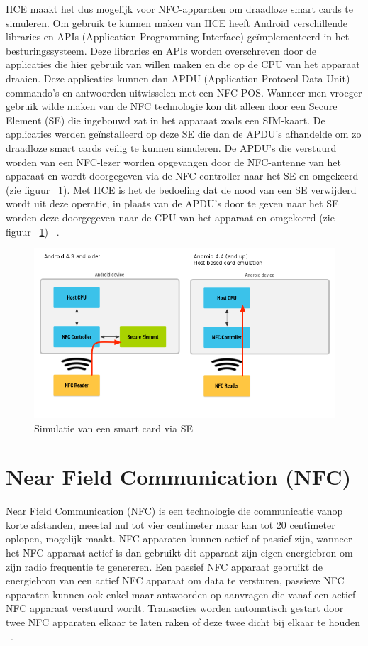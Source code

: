 HCE maakt het dus mogelijk voor NFC-apparaten om draadloze smart cards te simuleren. Om gebruik te kunnen maken van HCE heeft Android verschillende libraries en APIs (Application Programming Interface) geïmplementeerd in het besturingssysteem. Deze libraries en APIs worden overschreven door de applicaties die hier gebruik van willen maken en die op de CPU van het apparaat draaien. Deze applicaties kunnen dan APDU (Application Protocol Data Unit) commando's en antwoorden uitwisselen met een NFC POS. Wanneer men vroeger gebruik wilde maken van de NFC technologie kon dit alleen door een Secure Element (SE) die ingebouwd zat in het apparaat zoals een SIM-kaart. De applicaties werden geïnstalleerd op deze SE die dan de APDU's afhandelde om zo draadloze smart cards veilig te kunnen simuleren. De APDU's die verstuurd worden van een NFC-lezer worden opgevangen door de NFC-antenne van het apparaat en wordt doorgegeven via de NFC controller naar het SE en omgekeerd (zie figuur  ~\ref{fig:SE-HCE}). Met HCE is het de bedoeling dat de nood van een SE verwijderd wordt uit deze operatie, in plaats van de APDU's door te geven naar het SE worden deze doorgegeven naar de CPU van het apparaat en omgekeerd (zie figuur ~\ref{fig:SE-HCE}) ~\autocite{Alattar2014}. 

\begin{figure}
	\includegraphics[width=\linewidth]
	{img/WalletHostBasedCardEmulation}
	\caption{Simulatie van een smart card via SE}
	\label{fig:SE-HCE}
\end{figure}


\section{Near Field Communication (NFC)}
\label{sec:NFC}
Near Field Communication (NFC) is een technologie die communicatie vanop korte afstanden, meestal nul tot vier centimeter maar kan tot 20 centimeter oplopen, mogelijk maakt. NFC apparaten kunnen actief of passief zijn, wanneer het NFC apparaat actief is dan gebruikt dit apparaat zijn eigen energiebron om zijn radio frequentie te genereren. Een passief NFC apparaat gebruikt de energiebron van een actief NFC apparaat om data te versturen, passieve NFC apparaten kunnen ook enkel maar antwoorden op aanvragen die vanaf een actief NFC apparaat verstuurd wordt. Transacties worden automatisch gestart door twee NFC apparaten elkaar te laten raken of deze twee dicht bij elkaar te houden ~\autocite{Alattar2014}. 

